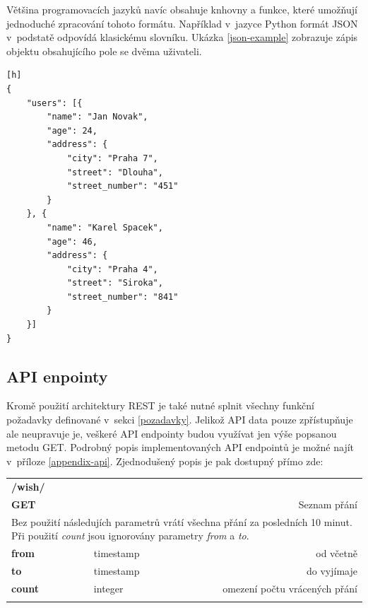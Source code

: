 \documentclass[thesis=B,czech]{FITthesis}[2012/06/26]
\begin{document}
	Většina programovacích jazyků navíc obsahuje knhovny a funkce, které umožňují jednoduché zpracování tohoto formátu. Například v~jazyce Python formát JSON v~podstatě odpovídá klasickému slovníku. Ukázka \ref{json-example} zobrazuje zápis objektu obsahujícího pole se dvěma uživateli. 
\begin{lstlisting}[caption={JSON obsahující pole se dvěma uživateli},label=json-example][h]
{
	"users": [{
		"name": "Jan Novak",
		"age": 24,
		"address": {
			"city": "Praha 7",
			"street": "Dlouha",
			"street_number": "451"
		}
	}, {
		"name": "Karel Spacek",
		"age": 46,
		"address": {
			"city": "Praha 4",
			"street": "Siroka",
			"street_number": "841"
		}
	}]
}
\end{lstlisting}
	
\subsection{API enpointy}
	Kromě použití architektury REST je také nutné splnit všechny funkční požadavky definované v~sekci \ref{pozadavky}. Jelikož API data pouze zpřístupňuje ale neupravuje je, veškeré API endpointy budou využívat jen výše popsanou metodu GET. Podrobný popis implementovaných API endpointů je možné najít v~příloze \ref{appendix-api}. Zjednodušený popis je pak dostupný přímo zde: 
	

\begin{table}[h]
\begin{tabular}{llllr}
\rowcolor[HTML]{EFEFEF}
\large \textbf{/wish/}        &         &                 &        & \multicolumn{1}{l}{}                \\
\rowcolor[HTML]{EFEFEF}
\textbf{GET}          &         &                 &        & Seznam přání                        \\
\multicolumn{5}{l}{\parbox[t]{12.8cm}{Bez použití následujích parametrů vrátí všechna přání za posledních 10 minut. Při použití \textit{count} jsou ignorovány parametry  \textit{from} a \textit{to}.}  } \\
\textbf{from}         &         & timestamp       &        & od včetně                           \\
\textbf{to}           &         & timestamp       &        & do vyjímaje                         \\
\textbf{count}        &         & integer         &        & omezení počtu vrácených přání      \\
 & & & & \\
\end{tabular}
\end{table}
\end{document}
